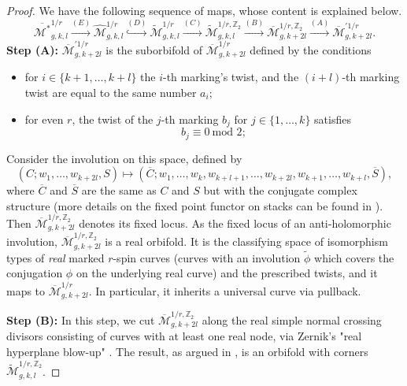 \documentclass[11pt,a4paper]{article}
\theoremstyle{definition}
\theoremstyle{remark}
\numberwithin{equation}{section}
\def\Mbar{{\overline{\mathcal M}}}
\def\Mbarstar{{\overline{\mathcal M^*}}}
\begin{document}
\begin{proof}
We have the following sequence of maps, whose content is explained below.
\begin{equation}
\Mbarstar_{g,k,l}^{1/r}\stackrel{(E)}{\to}\widehat{\mathcal{M}}_{g,k,l}^{1/r}\stackrel{(D)}{\hookrightarrow}\widetilde{\mathcal{M}}_{g,k,l}^{1/r}\stackrel{(C)}{\to}\widetilde{\mathcal{M}}_{g,k,l}^{1/r,{\mathbb Z}_2}\stackrel{(B)}{\to}
\overline{\mathcal{M}}_{g,k+2l}^{1/r,{\mathbb Z}_2}\stackrel{(A)}{\to}\Mbar_{g,k+2l}^{'1/r}.
\end{equation}
\textbf{Step (A): }
$\overline{\mathcal{M}}_{g,k+2l}^{'1/r}$ is the suborbifold of $\Mbar_{g,k+2l}^{1/r}$ defined by the conditions
\begin{itemize}
    \item for $i\in\{k+1,\ldots,k+l\}$ the $i$-th marking's twist, and the $(i+l)$-th marking twist are equal to the same number $a_i;$
    \item  for even $r$, the twist of the $j$-th marking $b_j$ for $j\in\{1,\ldots, k\}$ satisfies
    \[b_j\equiv 0~\text{mod~2};\]
\end{itemize} 
Consider the involution on this space, defined by
\[(C;w_1, \ldots, w_{k+2l}, S) \mapsto (\overline{C}; w_1, \ldots, w_k, w_{k+l+1},\ldots, w_{k+2l},w_{k+1},\ldots,w_{k+l}, \overline{S}),\]
where $\overline{C}$ and $\overline{S}$ are the same as $C$ and $S$ but with the conjugate complex structure (more details on the fixed point functor on stacks can be found in \cite{fixedPointStack}). Then $\Mbar_{g,k+2l}^{1/r, {\mathbb Z}_2}$ denotes its fixed locus. As the fixed locus of an anti-holomorphic involution, $\Mbar_{g,k+2l}^{1/r, {\mathbb Z}_2}$ is a real orbifold.  It is the classifying space of isomorphism types of \emph{real} marked $r$-spin curves (curves with an involution $\widetilde\phi$ which covers the conjugation $\phi$ on the underlying real curve) and the prescribed twists, and it maps to $\Mbar_{g,k+2l}^{1/r}$. In particular, it inherits a universal curve via pullback.

\textbf{Step (B): }
In this step, we cut $\overline{\mathcal{M}}_{g,k+2l}^{1/r,{\mathbb Z}_2}$ along the real simple normal crossing divisors consisting of curves with at least one real node, via Zernik's "real hyperplane blow-up" \cite{Zernik}. The result, as argued in \cite[Section 3.3]{Zernik}, is an orbifold with corners $\widetilde{\mathcal{M}}_{g,k,l}^{1/r, {\mathbb Z}_2}$.  


\end{proof}
\end{document}
